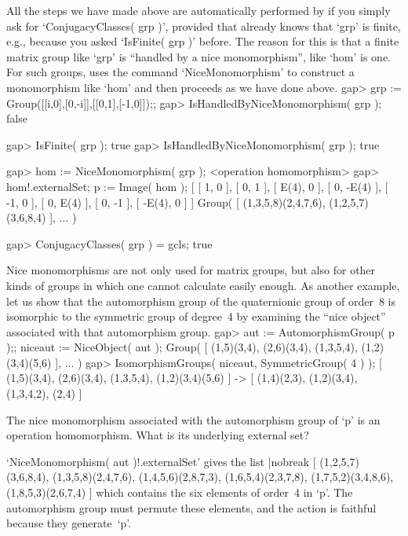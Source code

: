 All the steps we have made above are automatically performed by {\GAP} if
you  simply   ask for `ConjugacyClasses(  grp  )',   provided that {\GAP}
already knows that  `grp' is finite,  e.g., because you asked  `IsFinite(
grp )'  before. The reason  for this is that a   finite matrix group like
`grp' is ``handled by a nice monomorphism'',  like `hom' is one. For such
groups,  {\GAP} uses  the command   `NiceMonomorphism'   to construct   a
monomorphism like `hom' and then proceeds as we have done above.
\beginexample
    gap> grp := Group([[i,0],[0,-i]],[[0,1],[-1,0]]);;
    gap> IsHandledByNiceMonomorphism( grp );
    false

    gap> IsFinite( grp );
    true
    gap> IsHandledByNiceMonomorphism( grp );
    true

    gap> hom := NiceMonomorphism( grp );
    <operation homomorphism>
    gap> hom!.externalSet; p := Image( hom );
    [ [ 1, 0 ], [ 0, 1 ], [ E(4), 0 ], [ 0, -E(4) ], [ -1, 0 ],
      [ 0, E(4) ], [ 0, -1 ], [ -E(4), 0 ] ]
    Group( [ (1,3,5,8)(2,4,7,6), (1,2,5,7)(3,6,8,4) ], ... )

    gap> ConjugacyClasses( grp ) = gcls;
    true
\endexample

Nice monomorphisms are   not only used  for matrix  groups, but  also for
other kinds of  groups  in which  one cannot calculate  easily enough. As
another   example, let  us    show that the   automorphism  group  of the
quaternionic  group of  order~8 is isomorphic  to  the symmetric group of
degree~4   by   examining  the ``nice   object''    associated with  that
automorphism group.
\beginexample
    gap> aut := AutomorphismGroup( p );; niceaut := NiceObject( aut );
    Group( [ (1,5)(3,4), (2,6)(3,4), (1,3,5,4), (1,2)(3,4)(5,6) ], ... )
    gap> IsomorphismGroups( niceaut, SymmetricGroup( 4 ) );
    [ (1,5)(3,4), (2,6)(3,4), (1,3,5,4), (1,2)(3,4)(5,6) ] -> 
    [ (1,4)(2,3), (1,2)(3,4), (1,3,4,2), (2,4) ]
\endexample

\exercise The nice monomorphism associated with the automorphism group of
`p' is an operation homomorphism. What is its underlying external set?

\answer `NiceMonomorphism( aut )!.externalSet' gives the list
\begintt|nobreak
    [ (1,2,5,7)(3,6,8,4), (1,3,5,8)(2,4,7,6), (1,4,5,6)(2,8,7,3), 
      (1,6,5,4)(2,3,7,8), (1,7,5,2)(3,4,8,6), (1,8,5,3)(2,6,7,4) ]
\endtt
which contains the six elements of order~4 in `p'. The automorphism group
must permute  these elements,  and the  action  is faithful because  they
generate~`p'.

